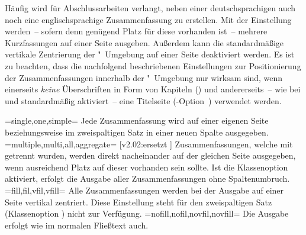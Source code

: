 \begin{DeclareEntity*}{}
\begin{DeclareEntity*}{}
\begin{DeclareEntity*}{}
\begin{Declaration}
Häufig wird für Abschlussarbeiten verlangt, neben einer deutschsprachigen auch 
noch eine englischsprachige Zusammenfassung zu erstellen. Mit der Einstellung 
 werden~-- sofern denn genügend Platz für diese 
vorhanden ist~-- mehrere Kurzfassungen auf einer Seite ausgeben. Außerdem kann 
die standardmäßige vertikale Zentrierung der "~Umgebung 
auf einer Seite deaktiviert werden. Es ist zu beachten, dass die nachfolgend 
beschriebenen Einstellungen zur Positionierung der Zusammenfassungen innerhalb 
der "~Umgebung nur wirksam sind, wenn einerseits 
\emph{keine} Überschriften in Form von Kapiteln ()
und andererseits~-- wie bei  und  
standardmäßig aktiviert~-- eine Titelseite 
(\KOMAScript-Option~) verwendet werden.
\begin{DeclareValues}
\itemval=single,one,simple=
  Jede Zusammenfassung wird auf einer eigenen Seite
  beziehungsweise im zweispaltigen Satz in einer neuen Spalte ausgegeben.
\itemval=multiple,multi,all,aggregate=%
    [v2.02:ersetzt ]
  Zusammenfassungen, welche mit  getrennt wurden, werden 
  direkt nacheinander auf der gleichen Seite ausgegeben, wenn ausreichend Platz 
  auf dieser vorhanden sein sollte. Ist die Klassenoption  
  aktiviert, erfolgt die Ausgabe aller Zusammenfassungen ohne Spaltenumbruch.
\itemval=fill,fil,vfil,vfill=
  Alle Zusammenfassungen werden bei der Ausgabe auf einer Seite vertikal 
  zentriert. Diese Einstellung steht für den zweispaltigen Satz
  (Klassenoption ) nicht zur Verfügung.
\itemval=nofill,nofil,novfil,novfill=
  Die Ausgabe erfolgt wie im normalen Fließtext auch.
\end{DeclareValues}
\end{Declaration}


\end{DeclareEntity*}
\end{DeclareEntity*}
\end{DeclareEntity*}
